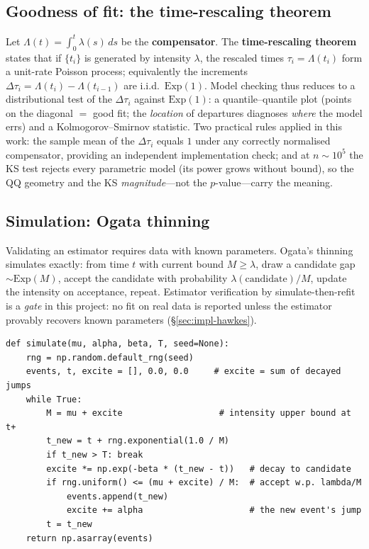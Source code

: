 \documentclass[11pt,a4paper]{report}
\newcommand{\keyword}[1]{\textbf{\color{accent2}#1}}
\begin{document}
\subsection{Goodness of fit: the time-rescaling theorem}
\label{sec:theory-rescaling}
Let $\Lambda(t)=\int_0^t\lambda(s)\,ds$ be the \keyword{compensator}. The
\keyword{time-rescaling theorem}~\cite{timerescaling} states that if
$\{t_i\}$ is generated by intensity $\lambda$, the rescaled times
$\tau_i=\Lambda(t_i)$ form a unit-rate Poisson process; equivalently the
increments $\Delta\tau_i=\Lambda(t_i)-\Lambda(t_{i-1})$ are i.i.d.\
$\mathrm{Exp}(1)$. Model checking thus reduces to a distributional test of
the $\Delta\tau_i$ against $\mathrm{Exp}(1)$: a quantile--quantile plot
(points on the diagonal $=$ good fit; the \emph{location} of departures
diagnoses \emph{where} the model errs) and a Kolmogorov--Smirnov statistic.
Two practical rules applied in this work: the sample mean of the
$\Delta\tau_i$ equals $1$ under any correctly normalised compensator,
providing an independent implementation check; and at $n\sim10^5$ the KS
test rejects every parametric model (its power grows without bound), so
the QQ geometry and the KS \emph{magnitude}---not the $p$-value---carry the
meaning.

\subsection{Simulation: Ogata thinning}
Validating an estimator requires data with known parameters. Ogata's
thinning~\cite{ogata} simulates exactly: from time $t$ with current bound
$M\ge\lambda$, draw a candidate gap $\sim\mathrm{Exp}(M)$, accept the
candidate with probability $\lambda(\text{candidate})/M$, update the
intensity on acceptance, repeat. Estimator verification by
simulate-then-refit is a \emph{gate} in this project: no fit on real data
is reported unless the estimator provably recovers known parameters
(\S\ref{sec:impl-hawkes}).

\begin{lstlisting}[caption={Ogata thinning for the exponential-kernel Hawkes
process (as implemented and tested).},label={lst:thinning}]
def simulate(mu, alpha, beta, T, seed=None):
    rng = np.random.default_rng(seed)
    events, t, excite = [], 0.0, 0.0     # excite = sum of decayed jumps
    while True:
        M = mu + excite                   # intensity upper bound at t+
        t_new = t + rng.exponential(1.0 / M)
        if t_new > T: break
        excite *= np.exp(-beta * (t_new - t))   # decay to candidate
        if rng.uniform() <= (mu + excite) / M:  # accept w.p. lambda/M
            events.append(t_new)
            excite += alpha                     # the new event's jump
        t = t_new
    return np.asarray(events)
\end{lstlisting}
\end{document}
